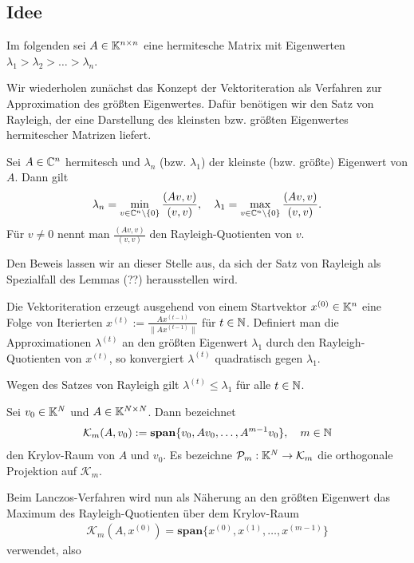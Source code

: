 \documentclass{article}
\begin{document}
\subsection{Idee}

Im folgenden sei $A \in \mathbb{K}^{n \times n}$ eine hermitesche Matrix mit Eigenwerten $\lambda_1 > \lambda_2 > \dots > \lambda_n$.

Wir wiederholen zunächst das Konzept der Vektoriteration als Verfahren zur Approximation des größten Eigenwertes. Dafür benötigen wir den Satz von Rayleigh, der eine Darstellung des kleinsten bzw. größten Eigenwertes hermitescher Matrizen liefert.

\begin{theorem}
	Sei $A \in \mathbb{C}^n$ hermitesch und $\lambda_n$ (bzw. $\lambda_1$) der kleinste (bzw. größte) Eigenwert von $A$. Dann gilt
	\begin{align*}
		\lambda_n = \min_{v \in \mathbb{C}^n \setminus \{0\}} \frac{(Av,v)}{(v,v)}, \quad \lambda_1 = \max_{v \in \mathbb{C}^n \setminus \{0\}} \frac{(Av,v)}{(v,v)}.
	\end{align*}
	Für $v \neq 0$ nennt man $\frac{(Av,v)}{(v,v)}$ den Rayleigh-Quotienten von $v$.
\end{theorem}

Den Beweis lassen wir an dieser Stelle aus, da sich der Satz von Rayleigh als Spezialfall des Lemmas (??) herausstellen wird.

Die Vektoriteration erzeugt ausgehend von einem Startvektor $x^{(0)} \in \mathbb{K}^{n}$ eine Folge von Iterierten $x^{(t)} := \frac{Ax^{(t-1)}}{\|Ax^{(t-1)}\|}$ für $t \in \mathbb{N}$. Definiert man die Approximationen $\lambda^{(t)}$ an den größten Eigenwert $\lambda_1$ durch den Rayleigh-Quotienten von $x^{(t)}$, so konvergiert $\lambda^{(t)}$ quadratisch gegen $\lambda_1$.

Wegen des Satzes von Rayleigh gilt $\lambda^{(t)} \leq \lambda_1$ für alle $t \in \mathbb{N}$.

\begin{definition}
	Sei $v_0 \in \mathbb{K}^{N}$ und $A \in \mathbb{K}^{N \times N}$. Dann bezeichnet
	\begin{align*}
		\mathcal{K}_m(A,v_0) := \textbf{span}\{v_0, Av_0, \dots, A^{m-1}v_0\}, \quad m \in \mathbb{N}
	\end{align*}
	den Krylov-Raum von $A$ und $v_0$. Es bezeichne $\mathcal{P}_m: \mathbb{K}^N \to \mathcal{K}_m$ die orthogonale Projektion auf $\mathcal{K}_m$.
\end{definition}

Beim Lanczos-Verfahren wird nun als Näherung an den größten Eigenwert das Maximum des Rayleigh-Quotienten über dem Krylov-Raum
\begin{align*}
	\mathcal{K}_m(A,x^{(0)}) = \textbf{span}\{x^{(0)}, x^{(1)}, \dots , x^{(m-1)} \}
\end{align*}
verwendet, also
\end{document}
